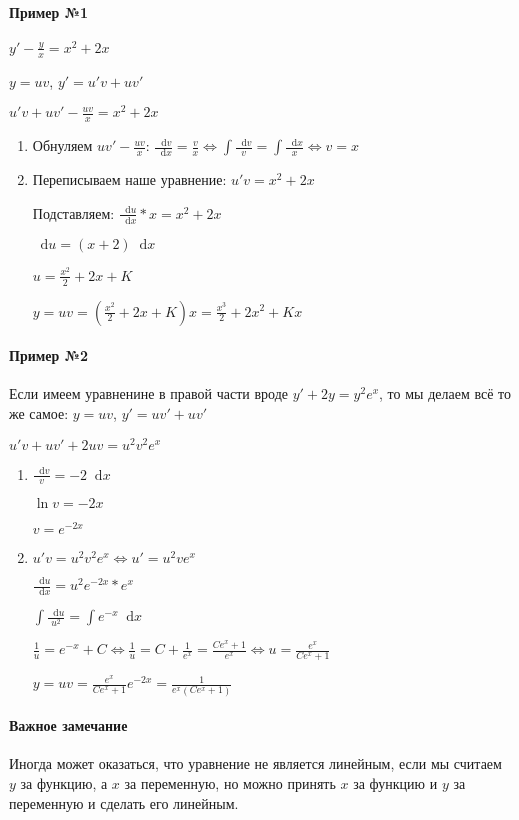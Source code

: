 \documentclass{article}
\newcommand*\diff{\mathop{}\!\mathrm{d}}
\begin{document}
\paragraph{Пример №1} $y' - \frac{y}{x} = x^2 + 2x$

$y = u v$, $y' = u' v + u v'$

$u'v + uv' - \frac{uv}{x} = x^2 + 2x$

\begin{enumerate}
    \item Обнуляем $uv' - \frac{uv}{x}$: $\frac{\diff v}{\diff x} = \frac{v}{x} \Longleftrightarrow \int \frac{\diff v}{v} = \int \frac{\diff x}{x} \Longleftrightarrow v = x$
    \item Переписываем наше уравнение: $u' v = x^2 + 2x$

    Подставляем: $\frac{\diff u}{\diff x} * x = x^2 + 2x$

    $\diff u = (x + 2) \diff x$

    $u = \frac{x^2}{2} + 2x + K$

    $y = u v = (\frac{x^2}{2} + 2x + K) x = \frac{x^3}{2} + 2x^2 + K x$
\end{enumerate}

\paragraph{Пример №2} Если имеем уравненине в правой части вроде $y' + 2y = y^2 e^{x}$, то мы делаем всё то же самое: $y = uv$, $y' = uv' + uv'$

$u' v + uv' + 2 u v = u^2 v^2 e^x$

\begin{enumerate}
    \item $\frac{\diff v}{v} = -2 \diff x$

    $\ln v = - 2 x$

    $v = e^{- 2x}$
    \item $u' v = u^2 v^2 e^{x} \Longleftrightarrow u' = u^2 v e^{x}$

    $\frac{\diff u}{\diff x} = u^2 e^{-2x} * e^{x}$

    $\int \frac{\diff u}{u^2} = \int e^{-x} \diff x$

    $\frac{1}{u} = e^{-x} + C \Longleftrightarrow \frac{1}{u} = C + \frac{1}{e^{x}} = \frac{C e^{x} + 1}{e^{x}} \Longleftrightarrow u = \frac{e^{x}}{C e^{x} + 1}$

    $y = u v = \frac{e^{x}}{C e^{x} + 1} e^{-2x} = \frac{1}{e^{x} (C e^{x} + 1)}$
\end{enumerate}

\paragraph{Важное замечание}

Иногда может оказаться, что уравнение не является линейным, если мы считаем $y$ за функцию, а $x$ за переменную, но можно принять $x$ за функцию и $y$ за переменную и сделать его линейным.
\end{document}
